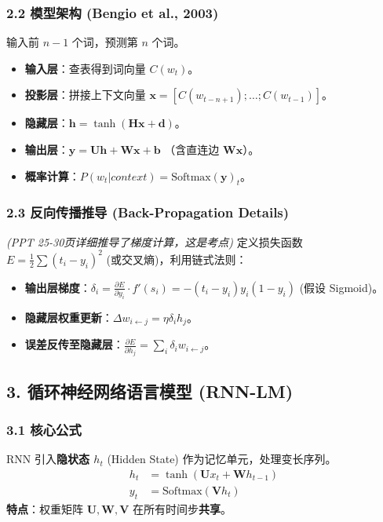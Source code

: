 \documentclass[a4paper, 11pt]{ctexart}
\begin{document}
\subsubsection{2.2 模型架构 (Bengio et al., 2003)}
输入前 $n-1$ 个词，预测第 $n$ 个词。
\begin{itemize}
    \item \textbf{输入层}：查表得到词向量 $C(w_t)$。
    \item \textbf{投影层}：拼接上下文向量 $\mathbf{x} = [C(w_{t-n+1}); \dots; C(w_{t-1})]$。
    \item \textbf{隐藏层}：$\mathbf{h} = \tanh(\mathbf{H}\mathbf{x} + \mathbf{d})$。
    \item \textbf{输出层}：$\mathbf{y} = \mathbf{U}\mathbf{h} + \mathbf{W}\mathbf{x} + \mathbf{b}$ （含直连边 $\mathbf{W}\mathbf{x}$）。
    \item \textbf{概率计算}：$P(w_t|context) = \text{Softmax}(\mathbf{y})_t$。
\end{itemize}

\subsubsection{2.3 反向传播推导 (Back-Propagation Details)}
\textit{(PPT 25-30页详细推导了梯度计算，这是考点)}
定义损失函数 $E = \frac{1}{2}\sum (t_i - y_i)^2$ (或交叉熵)，利用链式法则：
\begin{itemize}
    \item \textbf{输出层梯度}：$\delta_i = \frac{\partial E}{\partial y_i} \cdot f'(s_i) = -(t_i - y_i) y_i (1-y_i)$ (假设 Sigmoid)。
    \item \textbf{隐藏层权重更新}：$\Delta w_{i \leftarrow j} = \eta \delta_i h_j$。
    \item \textbf{误差反传至隐藏层}：$\frac{\partial E}{\partial h_j} = \sum_i \delta_i w_{i \leftarrow j}$。
\end{itemize}

\subsection{3. 循环神经网络语言模型 (RNN-LM)}

\subsubsection{3.1 核心公式}
RNN 引入\textbf{隐状态 $h_t$} (Hidden State) 作为记忆单元，处理变长序列。
\begin{align}
    h_t &= \tanh(\mathbf{U} x_t + \mathbf{W} h_{t-1}) \\
    y_t &= \text{Softmax}(\mathbf{V} h_t)
\end{align}
\textbf{特点}：权重矩阵 $\mathbf{U}, \mathbf{W}, \mathbf{V}$ 在所有时间步\textbf{共享}。
\end{document}

